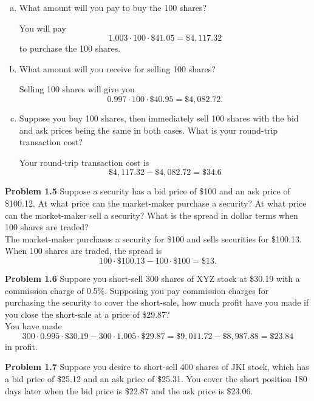 \documentclass[12pt]{article}
\newcommand{\problem}[1]{\bigskip \noindent \textbf{Problem #1}}
\theoremstyle{plain}
\begin{document}
\begin{enumerate}[(a)]
\item What amount will you pay to buy the 100 shares?

You will pay
\[
1.003 \cdot 100 \cdot \$41.05 = \$4,117.32
\]
to purchase the 100 shares.

\item What amount will you receive for selling 100 shares?

Selling 100 shares will give you
\[
0.997 \cdot 100 \cdot \$40.95 = \$4,082.72.
\]

\item Suppose you buy 100 shares, then immediately sell 100 shares with the bid and ask prices being the same in both cases. What is your round-trip transaction cost?

Your round-trip transaction cost is
\[
\$4,117.32 - \$4,082.72 = \$34.6
\]
\end{enumerate}

\problem{1.5} Suppose a security has a bid price of \$100 and an ask price of \$100.12. At what price can the market-maker purchase a security? At what price can the market-maker sell a security? What is the spread in dollar terms when 100 shares are traded?\\

The market-maker purchases a security for \$100 and sells securities for \$100.13. When 100 shares are traded, the spread is
\[
100 \cdot \$100.13 - 100 \cdot \$100 = \$13.
\]

\problem{1.6} Suppose you short-sell 300 shares of XYZ stock at \$30.19 with a commission charge of 0.5\%. Supposing you pay commission charges for purchasing the security to cover the short-sale, how much profit have you made if you close the short-sale at a price of \$29.87?\\

You have made
\[
300 \cdot 0.995 \cdot \$30.19 - 300 \cdot 1.005 \cdot \$29.87 = \$9,011.72 - \$8,987.88 = \$23.84
\]
in profit.

\problem{1.7} Suppose you desire to short-sell 400 shares of JKI stock, which has a bid price of \$25.12 and an ask price of \$25.31. You cover the short position 180 days later when the bid price is \$22.87 and the ask price is \$23.06.
\end{document}
